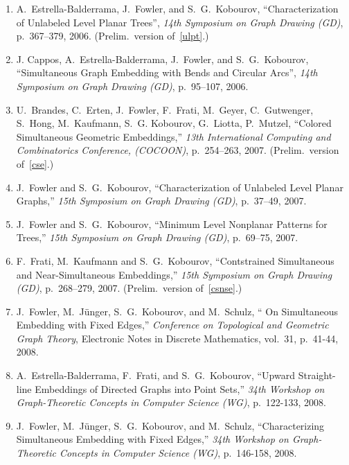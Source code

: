 \documentclass[10pt]{article}
\begin{document}
\begin{description}
\begin{enumerate}
\item A.~Estrella-Balderrama, J.~Fowler, and S.~G.~Kobourov, ``Characterization of Unlabeled Level Planar Trees'', {\em 14th Symposium on Graph Drawing (GD)}, p.~367--379, 2006.
(Prelim.~version of~\ref{ulpt}.)

\item J. Cappos, A.~Estrella-Balderrama, J.~Fowler, and S.~G.~Kobourov, ``Simultaneous Graph Embedding with Bends and Circular Arcs'', {\em 14th Symposium on Graph Drawing (GD)}, p.~95--107, 2006.

\item U.~Brandes, C.~Erten, J.~Fowler, F.~Frati, M.~Geyer, C.~Gutwenger, S.~Hong, M.~Kaufmann, S.~G. Kobourov, G.~Liotta, P.~Mutzel, ``Colored Simultaneous Geometric Embeddings,'' {\em  13th International Computing and Combinatorics Conference, (COCOON)}, p.~254--263, 2007. (Prelim.~version of~\ref{cse}.)

\item J.~Fowler and S.~G.~Kobourov, ``Characterization of Unlabeled Level Planar Graphs,'' {\em 15th Symposium on Graph Drawing (GD)}, p.~37--49, 2007.

\item J.~Fowler and S.~G.~Kobourov, ``Minimum Level Nonplanar Patterns for Trees,'' {\em 15th Symposium on Graph Drawing (GD)}, p.~69--75, 2007.

\item F.~Frati, M.~Kaufmann and S.~G.~Kobourov, ``Contstrained Simultaneous and Near-Simultaneous Embeddings,'' {\em 15th Symposium on Graph Drawing (GD)}, p.~268--279, 2007. (Prelim.~version of~\ref{csnse}.)


\item J.~Fowler, M.~J{\"u}nger, S.~G.~Kobourov, and M.~Schulz, ``
On Simultaneous Embedding with Fixed Edges,'' {\em Conference on Topological and Geometric Graph Theory}, Electronic Notes in Discrete Mathematics, vol.~31, p.~41-44, 2008. 


\item A.~Estrella-Balderrama, F.~Frati, and S.~G.~Kobourov, ``Upward Straight-line Embeddings of Directed Graphs into Point Sets,'' {\em 34th Workshop on Graph-Theoretic Concepts in Computer
Science (WG)}, p.~122-133, 2008.

\item J.~Fowler, M.~J{\"u}nger, S.~G.~Kobourov, and M.~Schulz, ``Characterizing Simultaneous Embedding with Fixed Edges,'' {\em 34th Workshop on Graph-Theoretic Concepts in Computer Science (WG)}, p.~146-158, 2008.


\end{enumerate}
\end{description}
\end{document}
